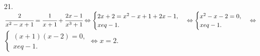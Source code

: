 21. $\cfrac{2}{x^2-x+1}=\cfrac{1}{x+1}+\cfrac{2x-1}{x^3+1}\Leftrightarrow \begin{cases} 2x+2=x^2-x+1+2x-1,\\ x
eq-1.\end{cases}
\Leftrightarrow \begin{cases} x^2-x-2=0,\\ x
eq-1.\end{cases}\Leftrightarrow$\\$\begin{cases} (x+1)(x-2)=0,\\ x
eq-1.\end{cases}\Leftrightarrow x=2.$\\

